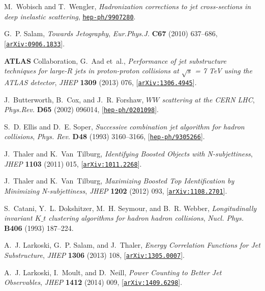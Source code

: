 \documentclass[a4paper,11pt]{article}
\begin{document}
\begin{thebibliography}{100}
M.~Wobisch and T.~Wengler, {\it {Hadronization corrections to jet
  cross-sections in deep inelastic scattering}},
  \href{http://arxiv.org/abs/hep-ph/9907280}{{\tt hep-ph/9907280}}.

G.~P. Salam, {\it {Towards Jetography}},  {\em Eur.Phys.J.} {\bf C67} (2010)
  637--686, [\href{http://arxiv.org/abs/0906.1833}{{\tt arXiv:0906.1833}}].

{\bf ATLAS} Collaboration, G.~Aad et~al., {\it {Performance of jet substructure
  techniques for large-$R$ jets in proton-proton collisions at $\sqrt{s}$ = 7
  TeV using the ATLAS detector}},  {\em JHEP} {\bf 1309} (2013) 076,
  [\href{http://arxiv.org/abs/1306.4945}{{\tt arXiv:1306.4945}}].

J.~Butterworth, B.~Cox, and J.~R. Forshaw, {\it {$W W$ scattering at the CERN
  LHC}},  {\em Phys.Rev.} {\bf D65} (2002) 096014,
  [\href{http://arxiv.org/abs/hep-ph/0201098}{{\tt hep-ph/0201098}}].

S.~D. Ellis and D.~E. Soper, {\it {Successive combination jet algorithm for
  hadron collisions}},  {\em Phys. Rev.} {\bf D48} (1993) 3160--3166,
  [\href{http://arxiv.org/abs/hep-ph/9305266}{{\tt hep-ph/9305266}}].

J.~Thaler and K.~Van~Tilburg, {\it {Identifying Boosted Objects with
  N-subjettiness}},  {\em JHEP} {\bf 1103} (2011) 015,
  [\href{http://arxiv.org/abs/1011.2268}{{\tt arXiv:1011.2268}}].

J.~Thaler and K.~Van~Tilburg, {\it {Maximizing Boosted Top Identification by
  Minimizing N-subjettiness}},  {\em JHEP} {\bf 1202} (2012) 093,
  [\href{http://arxiv.org/abs/1108.2701}{{\tt arXiv:1108.2701}}].

S.~Catani, Y.~L. Dokshitzer, M.~H. Seymour, and B.~R. Webber, {\it
  {Longitudinally invariant $K\_t$ clustering algorithms for hadron hadron
  collisions}},  {\em Nucl. Phys.} {\bf B406} (1993) 187--224.

A.~J. Larkoski, G.~P. Salam, and J.~Thaler, {\it {Energy Correlation Functions
  for Jet Substructure}},  {\em JHEP} {\bf 1306} (2013) 108,
  [\href{http://arxiv.org/abs/1305.0007}{{\tt arXiv:1305.0007}}].

A.~J. Larkoski, I.~Moult, and D.~Neill, {\it {Power Counting to Better Jet
  Observables}},  {\em JHEP} {\bf 1412} (2014) 009,
  [\href{http://arxiv.org/abs/1409.6298}{{\tt arXiv:1409.6298}}].


\end{thebibliography}
\end{document}
